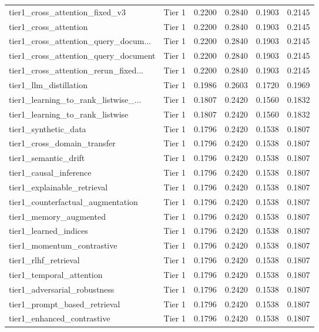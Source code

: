 \begin{longtable}{lccccc}
tier1\_cross\_attention\_fixed\_v3 & Tier 1 & 0.2200 & 0.2840 & 0.1903 & 0.2145 \\
tier1\_cross\_attention & Tier 1 & 0.2200 & 0.2840 & 0.1903 & 0.2145 \\
tier1\_cross\_attention\_query\_docum... & Tier 1 & 0.2200 & 0.2840 & 0.1903 & 0.2145 \\
tier1\_cross\_attention\_query\_document & Tier 1 & 0.2200 & 0.2840 & 0.1903 & 0.2145 \\
tier1\_cross\_attention\_rerun\_fixed... & Tier 1 & 0.2200 & 0.2840 & 0.1903 & 0.2145 \\
tier1\_llm\_distillation & Tier 1 & 0.1986 & 0.2603 & 0.1720 & 0.1969 \\
tier1\_learning\_to\_rank\_listwise\_... & Tier 1 & 0.1807 & 0.2420 & 0.1560 & 0.1832 \\
tier1\_learning\_to\_rank\_listwise & Tier 1 & 0.1807 & 0.2420 & 0.1560 & 0.1832 \\
tier1\_synthetic\_data & Tier 1 & 0.1796 & 0.2420 & 0.1538 & 0.1807 \\
tier1\_cross\_domain\_transfer & Tier 1 & 0.1796 & 0.2420 & 0.1538 & 0.1807 \\
tier1\_semantic\_drift & Tier 1 & 0.1796 & 0.2420 & 0.1538 & 0.1807 \\
tier1\_causal\_inference & Tier 1 & 0.1796 & 0.2420 & 0.1538 & 0.1807 \\
tier1\_explainable\_retrieval & Tier 1 & 0.1796 & 0.2420 & 0.1538 & 0.1807 \\
tier1\_counterfactual\_augmentation & Tier 1 & 0.1796 & 0.2420 & 0.1538 & 0.1807 \\
tier1\_memory\_augmented & Tier 1 & 0.1796 & 0.2420 & 0.1538 & 0.1807 \\
tier1\_learned\_indices & Tier 1 & 0.1796 & 0.2420 & 0.1538 & 0.1807 \\
tier1\_momentum\_contrastive & Tier 1 & 0.1796 & 0.2420 & 0.1538 & 0.1807 \\
tier1\_rlhf\_retrieval & Tier 1 & 0.1796 & 0.2420 & 0.1538 & 0.1807 \\
tier1\_temporal\_attention & Tier 1 & 0.1796 & 0.2420 & 0.1538 & 0.1807 \\
tier1\_adversarial\_robustness & Tier 1 & 0.1796 & 0.2420 & 0.1538 & 0.1807 \\
tier1\_prompt\_based\_retrieval & Tier 1 & 0.1796 & 0.2420 & 0.1538 & 0.1807 \\
tier1\_enhanced\_contrastive & Tier 1 & 0.1796 & 0.2420 & 0.1538 & 0.1807 \\

\end{longtable}
